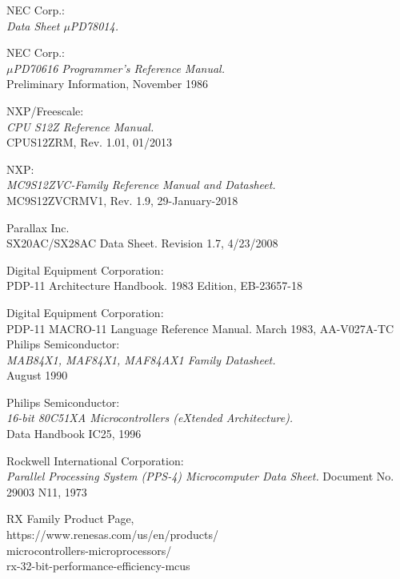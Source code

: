  NEC Corp.: \\
                  {\em Data Sheet $\mu$PD78014.\/}

 NEC Corp.: \\
                {\em $\mu$PD70616 Programmer's Reference Manual.\/} \\
                Preliminary Information, November 1986

 NXP/Freescale: \\
                {\em CPU S12Z Reference Manual.} \\
                CPUS12ZRM, Rev. 1.01, 01/2013

 NXP: \\
                {\em MC9S12ZVC-Family Reference Manual and Datasheet.} \\
                MC9S12ZVCRMV1, Rev. 1.9, 29-January-2018

 Parallax Inc. \\
                  { SX20AC/SX28AC Data Sheet.}
                  Revision 1.7, 4/23/2008

 Digital Equipment Corporation: \\
                  { PDP-11 Architecture Handbook.}
                  1983 Edition, EB-23657-18

 Digital Equipment Corporation: \\
                  { PDP-11 MACRO-11 Language Reference Manual.}
                  March 1983, AA-V027A-TC
 Philips Semiconductor: \\
                 {\em MAB84X1, MAF84X1, MAF84AX1 Family Datasheet.} \\
                 August 1990

 Philips Semiconductor: \\
                 {\em 16-bit 80C51XA Microcontrollers (eXtended
                  Architecture).\/} \\
                 Data Handbook IC25, 1996

 Rockwell International Corporation: \\
                  {\em Parallel Processing System (PPS-4) Microcomputer Data Sheet.}
                 Document No. 29003 N11, 1973

 RX Family Product Page, \\
                 https://www.renesas.com/us/en/products/ \\
                 microcontrollers-microprocessors/ \\
                 rx-32-bit-performance-efficiency-mcus

